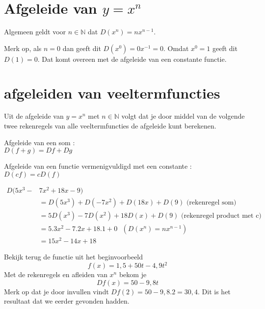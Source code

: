 \documentclass{article}
\begin{document}
\section{Afgeleide van $y=x^n$}

\noindent Algemeen geldt voor $n\in \mathbb{N}$ dat $D(x^n)=nx^{n-1}$.\vspace{3mm}

Merk op, als $n=0$ dan geeft dit $D(x^0)=0x^{-1}=0$.
Omdat $x^0=1$ geeft dit $D(1)=0$.
Dat komt overeen met de afgeleide van een constante functie.

\section{afgeleiden van veeltermfuncties}

Uit de afgeleide van $y=x^n$ met $n\in \mathbb{N}$ volgt dat je door middel van de volgende twee rekenregels van alle veeltermfuncties de afgeleide kunt berekenen.

\begin{eigenschap} Afgeleide van een som : \\
$\boxed { D(f+g)=Df+Dg}$
\end{eigenschap}

\begin{eigenschap} Afgeleide van een functie vermenigvuldigd met een constante :
$\boxed { D(cf)=cD(f)}$
\end{eigenschap}

\begin{voorbeeld}
\begin{equation*}
\begin{split}
D(5x^3-&7x^2+18x-9)\\
&=D(5x^3)+D(-7x^2)+D(18x)+D(9) \text{ (rekenregel som)}\\
&=5D(x^3)-7D(x^2)+18D(x)+D(9) \text{ (rekenregel product met c)}\\
&=5.3x^2-7.2x+18.1+0 \text{ $(D(x^n)=nx^{n-1})$}\\
&=15x^2-14x+18
\end{split}
\end{equation*}
\end{voorbeeld}

\begin{voorbeeld}
Bekijk terug de functie uit het beginvoorbeeld
\[
f(x)=1,5+50t-4,9t^2
\]
Met de rekenregels en afleiden van $x^n$ bekom je
\[
Df(x)=50-9,8t
\]
Merk op dat je door invullen vindt $Df(2)=50-9,8.2=30,4$.
Dit is het resultaat dat we eerder gevonden hadden.
\end{voorbeeld}
\end{document}
